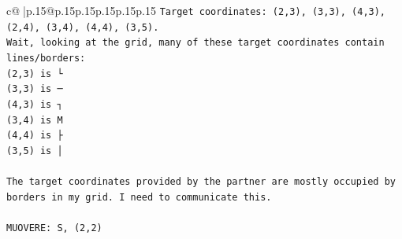 \documentclass{article}
\begin{document}
{\begin{supertabular}{c@{$\;$}|p{.15\linewidth}@{}p{.15\linewidth}p{.15\linewidth}p{.15\linewidth}p{.15\linewidth}p{.15\linewidth}}
{{{\texttt{Target coordinates: (2,3), (3,3), (4,3), (2,4), (3,4), (4,4), (3,5).} \\
\texttt{Wait, looking at the grid, many of these target coordinates contain lines/borders:} \\
\texttt{(2,3) is └} \\
\texttt{(3,3) is ─} \\
\texttt{(4,3) is ┐} \\
\texttt{(3,4) is M} \\
\texttt{(4,4) is ├} \\
\texttt{(3,5) is │} \\
\\ 
\texttt{The target coordinates provided by the partner are mostly occupied by borders in my grid. I need to communicate this.} \\
\\ 
\texttt{MUOVERE: S, (2,2)} \\
            }
        }
    }
     \\ \\


\end{supertabular}}
\end{document}

